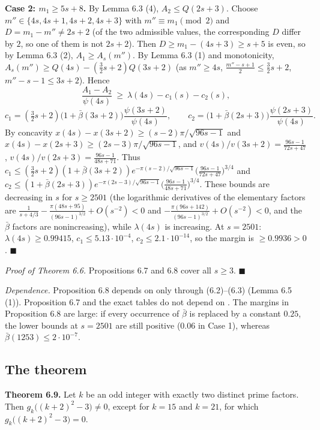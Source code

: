 \textbf{Case 2: \(m_1\ge5s+8\).} By Lemma 6.3 (4), \(A_2\le Q(2s+3)\). Choose \(m''\in\{4s,4s+1,4s+2,4s+3\}\) with \(m''\equiv m_1\pmod2\) and \(D=m_1-m''\ne2s+2\) (of the two admissible values, the corresponding \(D\) differ by \(2\), so one of them is not \(2s+2\)). Then \(D\ge m_1-(4s+3)\ge s+5\) is even, so by Lemma 6.3 (2), \(A_1\ge A_s(m'')\). By Lemma 6.3 (1) and monotonicity, \(A_s(m'')\ge Q(4s)-(\tfrac32s+2)Q(3s+2)\) (as \(m''\ge4s\), \(\frac{m''-s+1}{2}\le\frac32s+2\), \(m''-s-1\le3s+2\)). Hence
\[\frac{A_1-A_2}{\psi(4s)}\ \ge\ \lambda(4s)-c_1(s)-c_2(s),\]
\[c_1=(\tfrac32s+2)\bigl(1+\bar\beta(3s+2)\bigr)\frac{\psi(3s+2)}{\psi(4s)},\qquad c_2=\bigl(1+\bar\beta(2s+3)\bigr)\frac{\psi(2s+3)}{\psi(4s)} .\]
By concavity \(x(4s)-x(3s+2)\ge(s-2)\pi/\sqrt{96s-1}\) and \(x(4s)-x(2s+3)\ge(2s-3)\pi/\sqrt{96s-1}\), and \(v(4s)/v(3s+2)=\frac{96s-1}{72s+47}\), \(v(4s)/v(2s+3)=\frac{96s-1}{48s+71}\). Thus \(c_1\le(\tfrac32s+2)(1+\bar\beta(3s+2))e^{-\pi(s-2)/\sqrt{96s-1}}\bigl(\tfrac{96s-1}{72s+47}\bigr)^{3/4}\) and \(c_2\le(1+\bar\beta(2s+3))e^{-\pi(2s-3)/\sqrt{96s-1}}\bigl(\tfrac{96s-1}{48s+71}\bigr)^{3/4}\). These bounds are decreasing in \(s\) for \(s\ge2501\) (the logarithmic derivatives of the elementary factors are \(\frac1{s+4/3}-\frac{\pi(48s+95)}{(96s-1)^{3/2}}+O(s^{-2})<0\) and \(-\frac{\pi(96s+142)}{(96s-1)^{3/2}}+O(s^{-2})<0\), and the \(\bar\beta\) factors are nonincreasing), while \(\lambda(4s)\) is increasing. At \(s=2501\): \(\lambda(4s)\ge0.99415\), \(c_1\le5.13\cdot10^{-4}\), \(c_2\le2.1\cdot10^{-14}\), so the margin is \(\ge0.9936>0\). \(\blacksquare\)

\emph{Proof of Theorem 6.6.} Propositions 6.7 and 6.8 cover all \(s\ge3\). \(\blacksquare\)

\emph{Dependence.} Proposition 6.8 depends on \cite{Chern} only through (6.2)--(6.3) (Lemma 6.5 (1)). Proposition 6.7 and the exact tables do not depend on \cite{Chern}. The margins in Proposition 6.8 are large: if every occurrence of \(\bar\beta\) is replaced by a constant \(0.25\), the lower bounds at \(s=2501\) are still positive (\(0.06\) in Case 1), whereas \(\bar\beta(1253)\le2\cdot10^{-7}\).

\subsection{The theorem}\label{the-theorem}

\textbf{Theorem 6.9.} Let \(k\) be an odd integer with exactly two distinct prime factors. Then \(g_k\bigl((k+2)^2-3\bigr)\ne0\), except for \(k=15\) and \(k=21\), for which \(g_k\bigl((k+2)^2-3\bigr)=0\).


